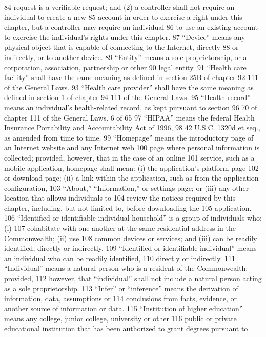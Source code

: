 84 request is a verifiable request; and (2) a controller shall not require an individual to create a new
85 account in order to exercise a right under this chapter, but a controller may require an individual
86 to use an existing account to exercise the individual’s rights under this chapter.
87 “Device” means any physical object that is capable of connecting to the Internet, directly
88 or indirectly, or to another device.
89 “Entity” means a sole proprietorship, or a corporation, association, partnership or other
90 legal entity.
91 “Health care facility” shall have the same meaning as defined in section 25B of chapter
92 111 of the General Laws.
93 “Health care provider” shall have the same meaning as defined in section 1 of chapter
94 111 of the General Laws.
95 “Health record” means an individual’s health-related record, as kept pursuant to section
96 70 of chapter 111 of the General Laws.
6 of 65
97 “HIPAA” means the federal Health Insurance Portability and Accountability Act of 1996,
98 42 U.S.C. 1320d et seq., as amended from time to time.
99 “Homepage” means the introductory page of an Internet website and any Internet web
100 page where personal information is collected; provided, however, that in the case of an online
101 service, such as a mobile application, homepage shall mean: (i) the application’s platform page
102 or download page; (ii) a link within the application, such as from the application configuration,
103 “About,” “Information,” or settings page; or (iii) any other location that allows individuals to
104 review the notices required by this chapter, including, but not limited to, before downloading the
105 application.
106 “Identified or identifiable individual household” is a group of individuals who: (i)
107 cohabitate with one another at the same residential address in the Commonwealth; (ii) use
108 common devices or services; and (iii) can be readily identified, directly or indirectly.
109 “Identified or identifiable individual” means an individual who can be readily identified,
110 directly or indirectly.
111 “Individual” means a natural person who is a resident of the Commonwealth; provided,
112 however, that “individual” shall not include a natural person acting as a sole proprietorship.
113 “Infer” or “inference” means the derivation of information, data, assumptions or
114 conclusions from facts, evidence, or another source of information or data.
115 “Institution of higher education” means any college, junior college, university or other
116 public or private educational institution that has been authorized to grant degrees pursuant to
